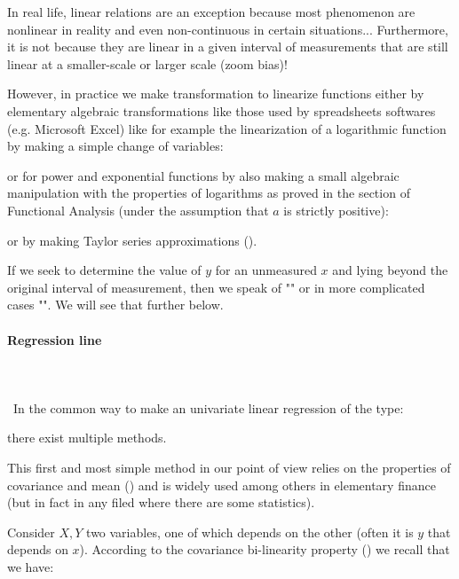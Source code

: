 	In real life, linear relations are an exception because most phenomenon are nonlinear in reality and even non-continuous in certain situations... Furthermore, it is not because they are linear in a given interval of measurements that are still linear at a smaller-scale or larger scale (zoom bias)!
	
	However, in practice we make transformation to linearize functions either by elementary algebraic transformations like those used by spreadsheets softwares (e.g. Microsoft Excel) like for example the linearization of a logarithmic function by making a simple change of variables:
	
	or for power and exponential functions by also making a small algebraic manipulation with the properties of logarithms as proved in the section of Functional Analysis (under the assumption that $a$ is strictly positive):
	
	or by making Taylor series approximations ().
	
	\begin{tcolorbox}[title=Remark,colframe=black,arc=10pt]
	If we seek to determine the value of $y$ for an unmeasured $x$ and lying beyond the original interval of measurement, then we speak of "" or in more complicated cases "". We will see that further below.
	\end{tcolorbox}	
	
	\paragraph{Regression line}\mbox{}\\\\\
	In the common way to make an univariate linear regression of the type:
	
	there exist multiple methods.
	
	This first and most simple method in our point of view relies on the properties of covariance and mean () and is widely used among others in elementary finance (but in fact in any filed where there are some statistics).
	
	Consider $X, Y$ two variables, one of which depends on the other (often it is $y$ that depends on $x$). According to the covariance bi-linearity property () we recall that we have:
	
